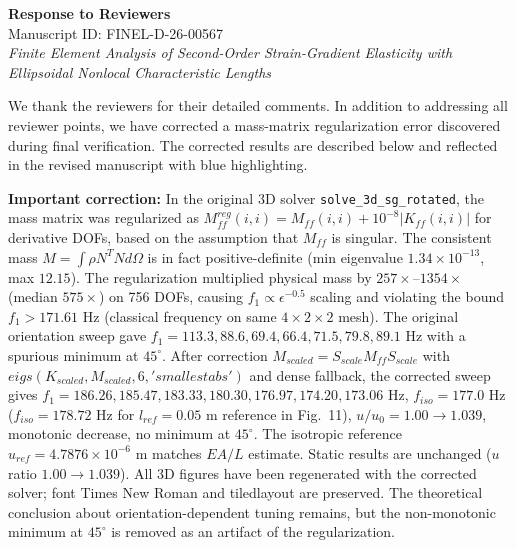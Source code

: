 \documentclass[12pt,a4paper]{article}
\begin{document}
\begin{center}
{\Large\bfseries Response to Reviewers}\\[2pt]
Manuscript ID: FINEL-D-26-00567\\[2pt]
\textit{Finite Element Analysis of Second-Order Strain-Gradient Elasticity with Ellipsoidal Nonlocal Characteristic Lengths}
\end{center}

\vspace{0.3cm}

We thank the reviewers for their detailed comments. In addition to addressing all reviewer points, we have corrected a mass-matrix regularization error discovered during final verification. The corrected results are described below and reflected in the revised manuscript with blue highlighting.

\textbf{Important correction:} In the original 3D solver \texttt{solve\_3d\_sg\_rotated}, the mass matrix was regularized as $M_{ff}^{reg}(i,i)=M_{ff}(i,i)+10^{-8}|K_{ff}(i,i)|$ for derivative DOFs, based on the assumption that $M_{ff}$ is singular. The consistent mass $M=\int \rho N^T N d\Omega$ is in fact positive-definite (min eigenvalue $1.34\times10^{-13}$, max $12.15$). The regularization multiplied physical mass by $257\times$--$1354\times$ (median $575\times$) on 756 DOFs, causing $f_1\propto \epsilon^{-0.5}$ scaling and violating the bound $f_1>171.61$ Hz (classical frequency on same $4\times2\times2$ mesh). The original orientation sweep gave $f_1=113.3,88.6,69.4,66.4,71.5,79.8,89.1$ Hz with a spurious minimum at $45^\circ$. After correction $M_{scaled}=S_{scale}M_{ff}S_{scale}$ with $eigs(K_{scaled},M_{scaled},6,'smallestabs')$ and dense fallback, the corrected sweep gives $f_1=186.26,185.47,183.33,180.30,176.97,174.20,173.06$ Hz, $f_{iso}=177.0$ Hz ($f_{iso}=178.72$ Hz for $l_{ref}=0.05$ m reference in Fig.~11), $u/u_0=1.00\to1.039$, monotonic decrease, no minimum at $45^\circ$. The isotropic reference $u_{ref}=4.7876\times10^{-6}$ m matches $EA/L$ estimate. Static results are unchanged ($u$ ratio $1.00\to1.039$). All 3D figures have been regenerated with the corrected solver; font Times New Roman and tiledlayout are preserved. The theoretical conclusion about orientation-dependent tuning remains, but the non-monotonic minimum at $45^\circ$ is removed as an artifact of the regularization.
\end{document}
